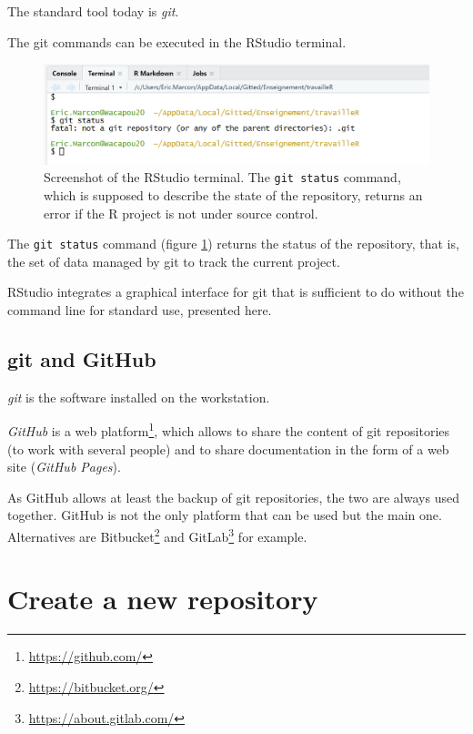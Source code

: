 \documentclass[
  12pt,
  american,
  a4paper,
  extrafontsizes,onecolumn,openright
  ]{memoir}
\newlength{\rf}
\begin{document}
The standard tool today is \emph{git}.

The git commands can be executed in the RStudio terminal.



\scriptsize

\begin{figure}

{\centering \includegraphics[width=0.8\linewidth]{images/git-Status} 

}

\caption{Screenshot of the RStudio terminal. The \texttt{git\ status} command, which is supposed to describe the state of the repository, returns an error if the R project is not under source control.}\label{fig:git-Status}
\end{figure}

\normalsize

The \texttt{git\ status} command (figure \ref{fig:git-Status}) returns the status of the repository, that is, the set of data managed by git to track the current project.

RStudio integrates a graphical interface for git that is sufficient to do without the command line for standard use, presented here.

\subsection{git and GitHub}\label{git-and-github-1}

\emph{git} is the software installed on the workstation.

\emph{GitHub} is a web platform\footnote{\url{https://github.com/}}, which allows to share the content of git repositories (to work with several people) and to share documentation in the form of a web site (\emph{GitHub Pages}).

As GitHub allows at least the backup of git repositories, the two are always used together.
GitHub is not the only platform that can be used but the main one.
Alternatives are Bitbucket\footnote{\url{https://bitbucket.org/}} and GitLab\footnote{\url{https://about.gitlab.com/}} for example.

\section{Create a new repository}\label{sec:creerdepot}
\end{document}
